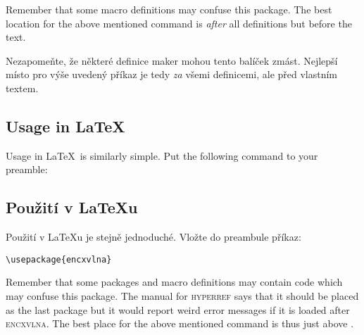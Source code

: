 \fi


\smallskip
\begin{verbatim}

\end{verbatim}

\smallskip


\ifeng

Remember that some macro definitions may confuse this package. The best location for the above
mentioned command is \textit{after} all definitions but before the text.

\else

Nezapomeňte, že některé definice maker mohou tento balíček zmást. Nejlepší místo pro výše uvedený
příkaz je tedy \textit{za} všemi definicemi, ale před vlastním textem.

\fi


\ifeng

\subsection{Usage in \LaTeX}
Usage in \LaTeX\ is similarly simple. Put the following command to your preamble:

\else

\subsection{\texorpdfstring{Použití}{Pouziti} v \LaTeX u}
Použití v \LaTeX{}u je stejně jednoduché. Vložte do preambule příkaz:

\fi


\smallskip
\begin{verbatim}
\usepackage{encxvlna}
\end{verbatim}

\smallskip


\ifeng

Remember that some packages and macro definitions may contain code which may confuse this package.
The manual for \textsc{hyperref} says that it should be placed as the last package but it would
report weird error messages if it is loaded after \textsc{encxvlna}. The best place for the above
mentioned command is thus just above \verb;;.

